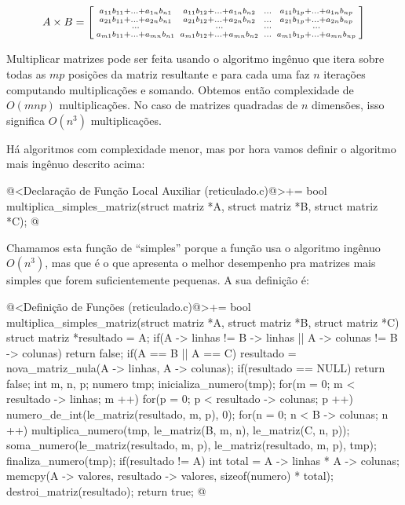 $$
A\times B = \left[{{a_{11}b_{11}+\ldots+a_{1n}b_{n1}\atop
a_{21}b_{11}+\ldots+a_{2n}b_{n1}}\atop{\ldots\atop
a_{m1}b_{11}+\ldots+a_{mn}b_{n1}}}
{{a_{11}b_{12}+\ldots+a_{1n}b_{n2}\atop
a_{21}b_{12}+\ldots+a_{2n}b_{n2}}\atop{\ldots\atop
a_{m1}b_{12}+\ldots+a_{mn}b_{n2}}}
{{\ldots\atop \ldots}\atop{\ldots\atop \ldots}}
{{a_{11}b_{1p}+\ldots+a_{1n}b_{np}\atop
a_{21}b_{1p}+\ldots+a_{2n}b_{np}}\atop{\ldots\atop
a_{m1}b_{1p}+\ldots+a_{mn}b_{np}}}
\right]
$$

Multiplicar matrizes pode ser feita usando o algoritmo ingênuo que
itera sobre todas as $mp$ posições da matriz resultante e para cada
uma faz $n$ iterações computando multiplicações e somando. Obtemos
então complexidade de $O(mnp)$ multiplicações. No caso de matrizes
quadradas de $n$ dimensões, isso significa $O(n^3)$ multiplicações.

Há algoritmos com complexidade menor, mas por hora vamos definir o
algoritmo mais ingênuo descrito acima:

\iniciocodigo
@<Declaração de Função Local Auxiliar (reticulado.c)@>+=
bool multiplica_simples_matriz(struct matriz *A, struct matriz *B,
                               struct matriz *C);
@
\fimcodigo

Chamamos esta função de ``simples'' porque a função usa o algoritmo
ingênuo $O(n^3)$, mas que é o que apresenta o melhor desempenho pra
matrizes mais simples que forem suficientemente pequenas. A sua
definição é:

\iniciocodigo
@<Definição de Funções (reticulado.c)@>+=
bool multiplica_simples_matriz(struct matriz *A, struct matriz *B,
                               struct matriz *C){
  struct matriz *resultado = A;
  if(A -> linhas != B -> linhas || A -> colunas != B -> colunas)
    return false;
  if(A == B || A == C){
    resultado = nova_matriz_nula(A -> linhas, A -> colunas);
    if(resultado == NULL)
      return false;
  }
  {
    int m, n, p;
    numero tmp;
    inicializa_numero(tmp);
    for(m = 0; m < resultado -> linhas; m ++)
      for(p = 0; p < resultado -> colunas; p ++){
        numero_de_int(le_matriz(resultado, m, p), 0);
        for(n = 0; n < B -> colunas; n ++){
          multiplica_numero(tmp, le_matriz(B, m, n), le_matriz(C, n, p));
          soma_numero(le_matriz(resultado, m, p),
                      le_matriz(resultado, m, p), tmp);
        }
      }
    finaliza_numero(tmp);
  }
  if(resultado != A){
    int total = A -> linhas * A -> colunas;
    memcpy(A -> valores, resultado -> valores, sizeof(numero) * total);
    destroi_matriz(resultado);
  }
  return true;
}
@
\fimcodigo

